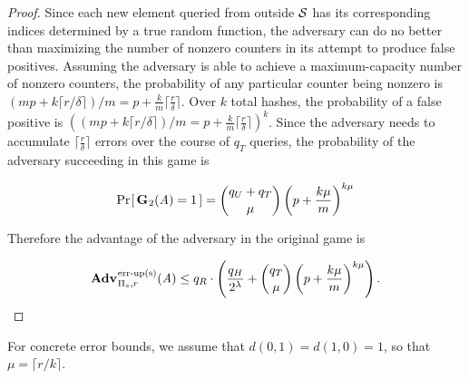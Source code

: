 \begin{proof}
Since each new element queried from outside $\mathcal{S}$ has its corresponding indices determined by a true random function, the adversary can do no better than maximizing the number of nonzero counters in its attempt to produce false positives. Assuming the adversary is able to achieve a maximum-capacity number of nonzero counters, the probability of any particular counter being nonzero is $(mp + k\lceil r/\delta \rceil)/m = p + \frac{k}{m}\lceil\frac{r}{\delta}\rceil$. Over $k$ total hashes, the probability of a false positive is $\left((mp + k\lceil r/\delta \rceil)/m = p + \frac{k}{m}\lceil\frac{r}{\delta}\rceil\right)^k$. Since the adversary needs to accumulate $\lceil\frac{r}{\delta}\rceil$ errors over the course of $q_T$ queries, the probability of the adversary succeeding in this game is

$$\Pr\hspace{-1pt}\left[\,\mathbf{G}\hspace{0.5pt}_2(\mathit{A}) = 1\,\right] = \binom{q_U + q_T}{\mu}\left(p+\frac{k\mu}{m}\right)^{k\mu}$$

Therefore the advantage of the adversary in the original game is

$$\Adv{\erreps}_{\struct_s,r}(\advA) \le q_R \cdot \left(\frac{q_H}{2^\lambda} + \binom{q_T}{\mu}\left(p+\frac{k\mu}{m}\right)^{k\mu}\right).$$\missingqed

\end{proof}

For concrete error bounds, we assume that $d(0,1) = d(1,0) = 1$, so that $\mu = \lceil r/k \rceil$.

